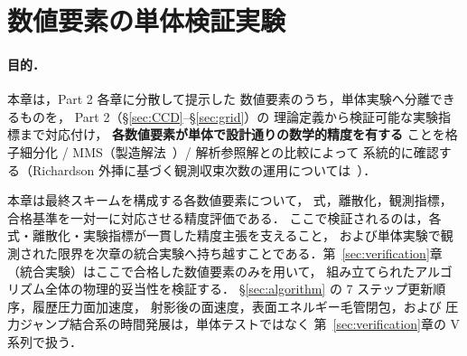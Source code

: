 %
\section{数値要素の単体検証実験}
\label{sec:numerical_integrity}%
\label{sec:impl_collocate}%
\label{sec:split_ppe_recovery}%
\label{sec:verify_ccd_convergence}%
\label{sec:verify_ccd_spectral_radius}%
\label{sec:verify_cls_advection}%
\label{sec:verify_cn_viscous}%
\label{sec:verify_cross_viscous}%
\label{sec:verify_curvature}%
\label{sec:verify_dc_spectral}%
\label{sec:verify_dccd_conservation}%
\label{sec:verify_dgr}%
\label{sec:verify_field_extension}%
\label{sec:verify_mixed_partial}%
\label{sec:verify_ns_grid_rebuild}%
\label{sec:verify_ppe}%
\label{sec:verify_ppe_neumann}%
\label{sec:verify_ppe_varrho}%
\label{sec:verify_reinit_shift}%
\label{sec:verify_split_ppe_dc}%
\label{sec:verify_time}%
\label{sec:verify_weno5_vs_dccd}%
\label{sec:cls_conservation}%
\label{sec:dc_iteration_accuracy}%
\label{tab:split_ppe_dc_convergence}%

\paragraph{目的．}
本章は，Part 2 各章に分散して提示した
数値要素のうち，単体実験へ分離できるものを，
Part 2（§\ref{sec:CCD}--§\ref{sec:grid}）の
理論定義から検証可能な実験指標まで対応付け，
\textbf{各数値要素が単体で設計通りの数学的精度を有する}
ことを格子細分化 / MMS（製造解法~\cite{Roache2002,SalariKnupp2000}）/ 解析参照解との比較によって
系統的に確認する（Richardson 外挿に基づく観測収束次数の運用については~\cite{Roy2003}）．

本章は最終スキームを構成する各数値要素について，
式，離散化，観測指標，合格基準を一対一に対応させる精度評価である．
ここで検証されるのは，各式・離散化・実験指標が一貫した精度主張を支えること，
および単体実験で観測された限界を次章の統合実験へ持ち越すことである．第~\ref{sec:verification}章
（統合実験）はここで合格した数値要素のみを用いて，
組み立てられたアルゴリズム全体の物理的妥当性を検証する．
§\ref{sec:algorithm} の 7 ステップ更新順序，履歴圧力面加速度，
射影後の面速度，表面エネルギー毛管閉包，および
圧力ジャンプ結合系の時間発展は，単体テストではなく
第~\ref{sec:verification}章の V 系列で扱う．

